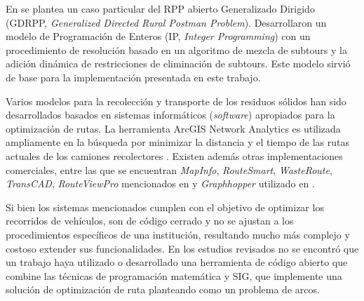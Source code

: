 En \citet{Braier2017AnArgentina} se plantea un caso particular del RPP abierto Generalizado Dirigido (GDRPP, \textit{Generalized Directed Rural Postman Problem}). Desarrollaron un modelo de Programación de Enteros (IP, \textit{Integer Programming}) con un procedimiento de resolución basado en un algoritmo de mezcla de subtours y la adición dinámica de restricciones de eliminación de subtours. Este modelo sirvió de base para la implementación presentada en este trabajo.

Varios modelos para la recolección y transporte de los residuos sólidos han sido desarrollados basados en sistemas informáticos (\textit{software}) apropiados para la optimización de rutas. La herramienta ArcGIS Network Analytics es utilizada ampliamente en la búsqueda por minimizar la distancia y el tiempo de las rutas actuales de los camiones recolectores \citep{Kallel2016UsingTunisia,Malakahmad2014SolidMalaysia}. Existen además otras implementaciones comerciales, entre las que se encuentran \textit{MapInfo}, \textit{RouteSmart}, \textit{WasteRoute}, \textit{TransCAD}, \textit{RouteViewPro} mencionados en \citet{Kallel2016UsingTunisia} y \textit{Graphhopper} utilizado en \citet{Lozano2018SmartOptimization}.

Si bien los sistemas mencionados cumplen con el objetivo de optimizar los recorridos de vehículos, son de código cerrado y no se ajustan a los procedimientos específicos de una institución, resultando mucho más complejo y costoso extender sus funcionalidades. En los estudios revisados no se encontró que un trabajo haya utilizado o desarrollado una herramienta de código abierto que combine las técnicas de programación matemática y SIG, que implemente una solución de optimización de ruta planteando como un problema de arcos. 

